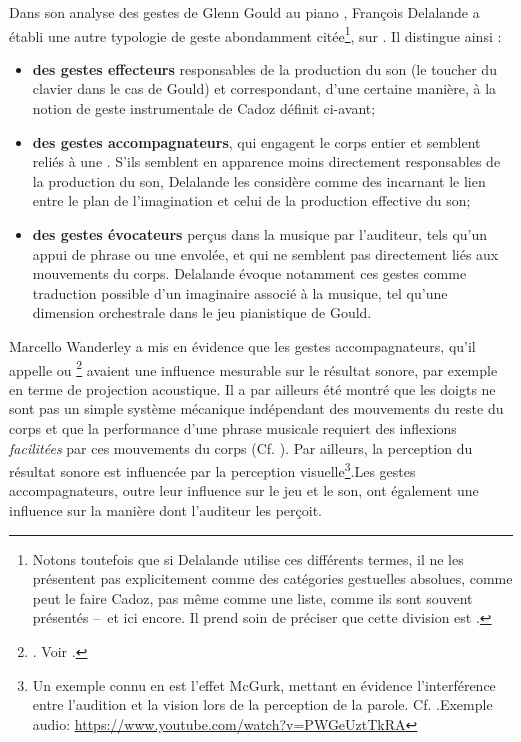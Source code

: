 \noindent Dans son analyse des gestes de Glenn Gould au piano \cite{delalande_geste_1988}, François Delalande a établi une autre typologie de geste abondamment citée\footnote{Notons toutefois que si Delalande utilise ces différents termes, il ne les présentent pas explicitement comme des catégories gestuelles absolues, comme peut le faire Cadoz, pas même comme une liste, comme ils sont souvent présentés --~et ici encore. Il prend soin de préciser que cette division est  \cite{delalande_geste_1988}.}, sur . Il distingue ainsi :
\vspace{-1em}
\begin{itemize}[noitemsep]
	\item \textbf{des gestes effecteurs} responsables de la production du son (le toucher du clavier dans le cas de Gould) et correspondant, d'une certaine manière, à la notion de geste instrumentale de Cadoz définit ci-avant;
	\item \textbf{des gestes accompagnateurs}, qui engagent le corps entier et semblent reliés à une . S'ils semblent en apparence moins directement responsables de la production du son, Delalande les considère comme des  incarnant le lien entre le plan de l'imagination et celui de la production effective du son;
	\item \textbf{des gestes évocateurs} perçus dans la musique par l'auditeur, tels qu'un appui de phrase ou une envolée, et qui ne semblent pas directement liés aux mouvements du corps. Delalande évoque notamment ces gestes comme traduction possible d'un imaginaire associé à la musique, tel qu'une dimension orchestrale dans le jeu pianistique de Gould.
\end{itemize}
\noindent Marcello Wanderley a mis en évidence que les gestes accompagnateurs, qu'il appelle  ou \footnote{. Voir \cite{wanderley_non-obvious_1999}.} avaient une influence mesurable sur le résultat sonore, par exemple en terme de projection acoustique. Il a par ailleurs été montré que les doigts ne sont pas un simple système mécanique indépendant des mouvements du reste du corps et que la performance d'une phrase musicale requiert des inflexions \textit{facilitées} par ces mouvements du corps (Cf. \cite{chadefaux_experimental_2012}). Par ailleurs, la perception du résultat sonore est influencée par la perception visuelle\footnote{\label{fn:mcgurk} Un exemple connu en est l'effet McGurk, mettant en évidence l'interférence entre l'audition et la vision lors de la perception de la parole. Cf. \cite{macdonald_visual_1978}.Exemple audio: \url{https://www.youtube.com/watch?v=PWGeUztTkRA}}.Les gestes accompagnateurs, outre leur influence sur le jeu et le son, ont également une influence sur la manière dont l'auditeur les perçoit.

